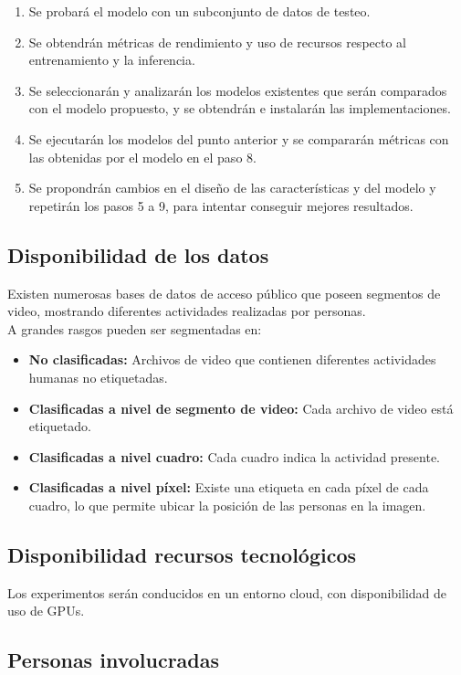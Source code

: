 \begin{enumerate}
	\item Se probará el modelo con un subconjunto de datos de testeo.
	\item Se obtendrán métricas de rendimiento y uso de recursos respecto al entrenamiento y la inferencia.
	\item Se seleccionarán y analizarán los modelos existentes que serán comparados con el modelo propuesto, y se obtendrán e instalarán las implementaciones.
	\item Se ejecutarán los modelos del punto anterior y se compararán métricas con las obtenidas por el modelo en el paso 8.
	\item Se propondrán cambios en el diseño de las características y del modelo y repetirán los pasos 5 a 9, para intentar conseguir mejores resultados.
\end{enumerate}

\subsection{Disponibilidad de los datos}

Existen numerosas bases de datos de acceso público que poseen segmentos de video, mostrando diferentes actividades realizadas por personas. \\

A grandes rasgos pueden ser segmentadas en:
\begin{itemize}
	\item {\bf No clasificadas:} Archivos de video que contienen diferentes actividades humanas no etiquetadas.
	\item {\bf Clasificadas a nivel de segmento de video:} Cada archivo de video está etiquetado.
	\item {\bf Clasificadas a nivel cuadro:} Cada cuadro indica la actividad presente.
	\item {\bf Clasificadas a nivel píxel:} Existe una etiqueta en cada píxel de cada cuadro, lo que permite ubicar la posición de las personas en la imagen.
\end{itemize}

\subsection{Disponibilidad recursos tecnológicos}

Los experimentos serán conducidos en un entorno cloud, con disponibilidad de uso de GPUs.

\subsection{Personas involucradas}

